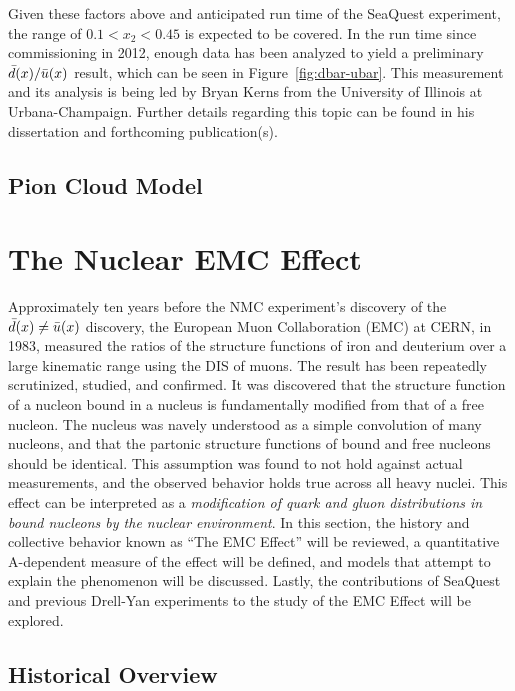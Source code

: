 Given these factors above and anticipated run time of the SeaQuest experiment, the range of $0.1<x_2<0.45$ is expected to be covered. In the run time since commissioning in 2012, enough data has been analyzed to yield a preliminary $\bar{d}(x)/\bar{u}(x)$ result, which can be seen in Figure~\ref{fig:dbar-ubar}. This measurement and its analysis is being led by Bryan Kerns from the University of Illinois at Urbana-Champaign. Further details regarding this topic can be found in his dissertation and forthcoming publication(s).

\subsection{Pion Cloud Model}


\section{The Nuclear EMC Effect}


Approximately ten years before the NMC experiment's discovery of the $\bar{d}(x)\neq\bar{u}(x)$ discovery, the European Muon Collaboration (EMC) at CERN, in 1983, measured the ratios of the structure functions of iron and deuterium over a large kinematic range using the DIS of muons\cite{Aubert:1983xm}. The result has been repeatedly scrutinized, studied, and confirmed. It was discovered that the structure function of a nucleon bound in a nucleus is fundamentally modified from that of a free nucleon. The nucleus was navely understood as a simple convolution of many nucleons, and that the partonic structure functions of bound and free nucleons should be identical. This assumption was found to not hold against actual measurements, and the observed behavior holds true across all heavy nuclei. This effect can be interpreted as a \emph{modification of quark and gluon distributions in bound nucleons by the nuclear environment}. In this section, the history and collective behavior known as ``The EMC Effect'' will be reviewed, a quantitative A-dependent measure of the effect will be defined, and models that attempt to explain the phenomenon will be discussed. Lastly, the contributions of SeaQuest and previous Drell-Yan experiments to the study of the EMC Effect will be explored.

\subsection{Historical Overview} \label{ssec:emc-history}

